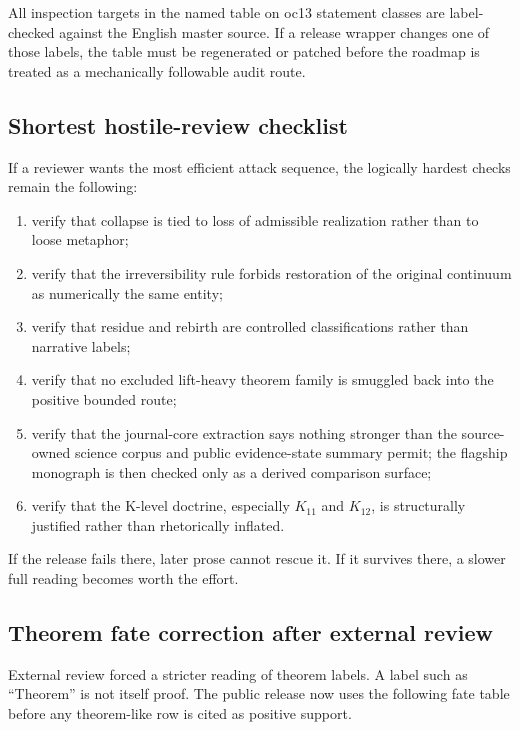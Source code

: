 All inspection targets in the named table on oc13 statement classes are
label-checked against the English master source. If a release wrapper changes
one of those labels, the table must be regenerated or patched before the
roadmap is treated as a mechanically followable audit route.

\subsection{Shortest hostile-review checklist}

If a reviewer wants the most efficient attack sequence, the logically hardest
checks remain the following:

\begin{enumerate}
\item verify that collapse is tied to loss of admissible realization rather
      than to loose metaphor;
\item verify that the irreversibility rule forbids restoration of the original
      continuum as numerically the same entity;
\item verify that residue and rebirth are controlled classifications rather
      than narrative labels;
\item verify that no excluded lift-heavy theorem family is smuggled back into
      the positive bounded route;
\item verify that the journal-core extraction says nothing stronger than the
      source-owned science corpus and public evidence-state summary permit; the flagship
      monograph is then checked only as a derived comparison surface;
\item verify that the K-level doctrine, especially \(K_{11}\) and \(K_{12}\),
      is structurally justified rather than rhetorically inflated.
\end{enumerate}

If the release fails there, later prose cannot rescue it. If it survives
there, a slower full reading becomes worth the effort.


\subsection{Theorem fate correction after external review}
\label{sec:oc13-theorem-fate-correction-v3}

External review forced a stricter reading of theorem labels. A label such as
``Theorem'' is not itself proof. The public release now uses the following fate
table before any theorem-like row is cited as positive support.

